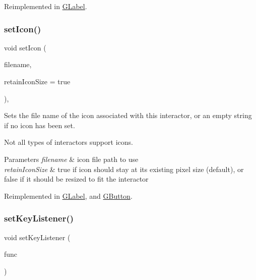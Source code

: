 Reimplemented in \mbox{\hyperlink{classGLabel_a8a1f6693796b536d1ace7ce0ff66afee}{G\+Label}}.

\mbox{\label{classGInteractor_a762e139aa311461c3984d3ad28293f64}} 
\subsubsection{\texorpdfstring{set\+Icon()}{setIcon()}}
{\footnotesize\ttfamily void set\+Icon (\begin{DoxyParamCaption}\item[{const std\+::string \&}]{filename,  }\item[{bool}]{retain\+Icon\+Size = {\ttfamily true} }\end{DoxyParamCaption})\hspace{0.3cm}{\ttfamily [virtual]}, {\ttfamily [inherited]}}



Sets the file name of the icon associated with this interactor, or an empty string if no icon has been set. 

Not all types of interactors support icons. 
\begin{DoxyParams}{Parameters}
{\em filename} & icon file path to use \\
\hline
{\em retain\+Icon\+Size} & true if icon should stay at its existing pixel size (default), or false if it should be resized to fit the interactor \\
\hline
\end{DoxyParams}


Reimplemented in \mbox{\hyperlink{classGLabel_a75753a3d7d3364185f8088d63b664cb1}{G\+Label}}, and \mbox{\hyperlink{classGButton_a75753a3d7d3364185f8088d63b664cb1}{G\+Button}}.

\mbox{\label{classGBrowserPane_aeb8324d3287fa1fbe093f4d6230cf0a6}} 
\subsubsection{\texorpdfstring{set\+Key\+Listener()}{setKeyListener()}\hspace{0.1cm}{\footnotesize\ttfamily [1/2]}}
{\footnotesize\ttfamily void set\+Key\+Listener (\begin{DoxyParamCaption}\item[{G\+Event\+Listener}]{func }\end{DoxyParamCaption})\hspace{0.3cm}{\ttfamily [virtual]}}



